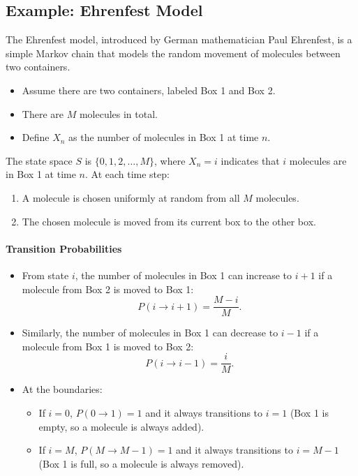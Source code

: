 \subsection{Example: Ehrenfest Model}
The Ehrenfest model, introduced by German mathematician Paul Ehrenfest, is a simple Markov chain that models the random movement of molecules between two containers.
\begin{itemize}
    \item Assume there are two containers, labeled Box 1 and Box 2.
    \item There are \( M \) molecules in total.
    \item Define \( X_n \) as the number of molecules in Box 1 at time \( n \).
\end{itemize}
The state space \( S \) is \( \{0, 1, 2, \dots, M\} \), where \( X_n = i \) indicates that \( i \) molecules are in Box 1 at time \( n \). At each time step:
\begin{enumerate}
    \item A molecule is chosen uniformly at random from all \( M \) molecules.
    \item The chosen molecule is moved from its current box to the other box.
\end{enumerate}

\paragraph{Transition Probabilities}
\begin{itemize}
    \item From state \( i \), the number of molecules in Box 1 can increase to \( i+1 \) if a molecule from Box 2 is moved to Box 1:
    \[
    P(i \to i+1) = \frac{M-i}{M}.
    \]
    \item Similarly, the number of molecules in Box 1 can decrease to \( i-1 \) if a molecule from Box 1 is moved to Box 2:
    \[
    P(i \to i-1) = \frac{i}{M}.
    \]
    \item At the boundaries:
        \begin{itemize}
            \item If \( i = 0 \), \( P(0 \to 1) = 1 \) and it always transitions to \( i = 1 \) (Box 1 is empty, so a molecule is always added).
            \item If \( i = M \), \( P(M \to M-1) = 1 \) and it always transitions to \( i = M-1 \) (Box 1 is full, so a molecule is always removed).
        \end{itemize}
\end{itemize}


